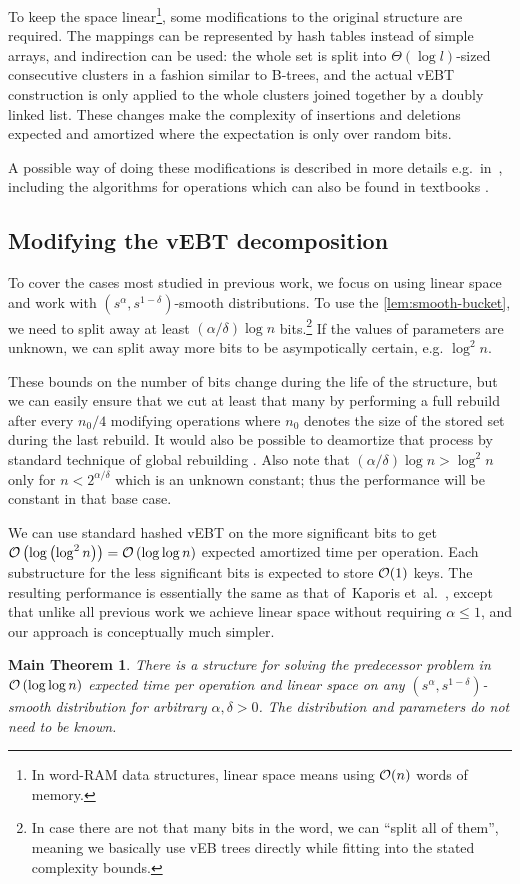 \documentclass[twoside,english,preprint]{elsarticle}
\theoremstyle{plain}
\theoremstyle{definition}
\theoremstyle{remark}
\theoremstyle{plain}
\theoremstyle{plain}
\newtheorem*{thm*}{Main Theorem}
\begin{document}
To keep the space linear\footnote{In word-RAM data structures, linear space means using $\mathcal O(n)$ words
of memory.}, some modifications to the original structure are required. The mappings
can be represented by hash tables instead of simple arrays, and indirection
can be used: the whole set is split into $\Theta(\log l)$-sized consecutive
clusters in a fashion similar to B-trees, and the actual vEBT construction
is only applied to the whole clusters joined together by a doubly
linked list. These changes make the complexity of insertions and deletions
expected and amortized where the expectation is only over random bits.

A possible way of doing these modifications is described in more details
e.g.~in~\cite[chapter 4]{Cunat10}, including the algorithms for
operations which can also be found in textbooks \cite[chapter 20]{intro2alg}.

\subsection{Modifying the vEBT decomposition}

To cover the cases most studied in previous work, we focus on using
linear space and work with $\left(s^{\alpha},s^{1-\delta}\right)$-smooth
distributions. To use the \ref{lem:smooth-bucket}, we need to split away at least
$(\alpha/\delta)\log n$ bits.\footnote{In case there are not that many bits in the word, we can ``split
all of them'', meaning we basically use vEB trees directly while
fitting into the stated complexity bounds.} If the values of parameters are unknown, we can split away more bits
to be asympotically certain, e.g. $\log^{2}n$.

These bounds on the number of bits change during the life of the structure,
but we can easily ensure that we cut at least that many by performing
a full rebuild after every $n_{0}/4$ modifying operations where $n_{0}$
denotes the size of the stored set during the last rebuild. It would
also be possible to deamortize that process by standard technique
of global rebuilding \cite{global-rebuilding}. Also note that $\left(\alpha/\delta\right)\log n>\log^{2}n$
only for $n<2^{\alpha/\delta}$ which is an unknown constant; thus
the performance will be constant in that base case.

We can use standard hashed vEBT on the more significant bits to get
$\mathcal O\left(\log\left(\log^{2}n\right)\right)=\mathcal O\left(\log\log n\right)$
expected amortized time per operation. Each substructure for the less
significant bits is expected to store $\mathcal O(1)$ keys. The resulting
performance is essentially the same as that of~Kaporis et~al.~\cite{KMSTTZ06},
except that unlike all previous work we achieve linear space without
requiring $\alpha\le1$, and our approach is conceptually much simpler.
\begin{thm*}%
There is a structure for solving the predecessor problem in $\mathcal O\left(\log\log n\right)$
expected time per operation and linear space on any $\left(s^{\alpha},s^{1-\delta}\right)$-smooth
distribution for arbitrary $\alpha,\delta>0$. The distribution and
parameters do not need to be known.
\end{thm*}
\end{document}
